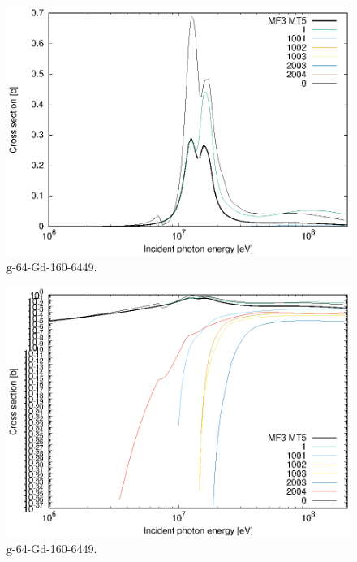\begin{figure}
 \includegraphics[width=\linewidth]{eps/g_64-Gd-160_6449.eps}
  \caption{g-64-Gd-160-6449.}
\end{figure}
\begin{figure}
 \includegraphics[width=\linewidth]{eps-log/g_64-Gd-160_6449.eps}
 \caption{g-64-Gd-160-6449.}
\end{figure}
\newpage \clearpage

